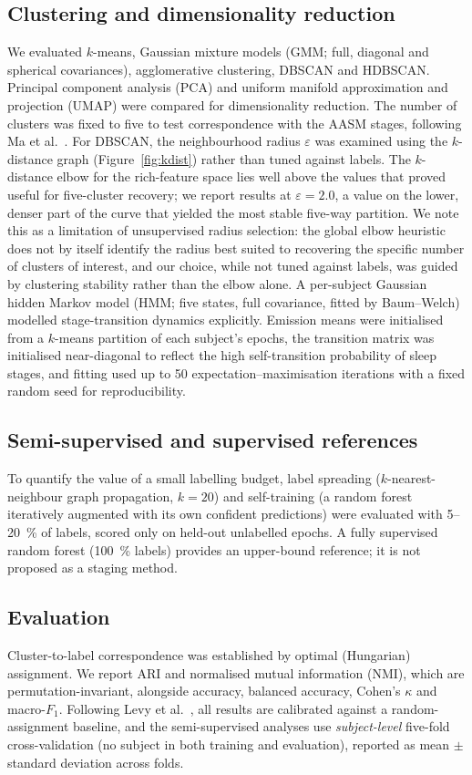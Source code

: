 \documentclass[11pt,a4paper]{article}
\begin{document}
\subsection{Clustering and dimensionality reduction}
We evaluated $k$-means, Gaussian mixture models (GMM; full, diagonal and spherical
covariances), agglomerative clustering, DBSCAN and HDBSCAN. Principal component
analysis (PCA) and uniform manifold approximation and projection (UMAP) were
compared for dimensionality reduction. The number of clusters was fixed to five to
test correspondence with the AASM stages, following Ma et al.~\cite{ma2026}. For
DBSCAN, the neighbourhood radius $\varepsilon$ was examined using the $k$-distance
graph (Figure~\ref{fig:kdist}) rather than tuned against labels. The $k$-distance
elbow for the rich-feature space lies well above the values that proved useful for
five-cluster recovery; we report results at $\varepsilon=2.0$, a value on the lower,
denser part of the curve that yielded the most stable five-way partition. We note
this as a limitation of unsupervised radius selection: the global elbow heuristic
does not by itself identify the radius best suited to recovering the specific
number of clusters of interest, and our choice, while not tuned against labels, was
guided by clustering stability rather than the elbow alone. A per-subject Gaussian hidden Markov
model (HMM; five states, full covariance, fitted by Baum--Welch) modelled
stage-transition dynamics explicitly. Emission means were initialised from a
$k$-means partition of each subject's epochs, the transition matrix was initialised
near-diagonal to reflect the high self-transition probability of sleep stages, and
fitting used up to 50 expectation--maximisation iterations with a fixed random seed
for reproducibility.

\subsection{Semi-supervised and supervised references}
To quantify the value of a small labelling budget, label spreading
($k$-nearest-neighbour graph propagation, $k=20$) and self-training (a random
forest iteratively augmented with its own confident predictions) were evaluated
with 5--\SI{20}{\percent} of labels, scored only on held-out unlabelled epochs. A
fully supervised random forest (\SI{100}{\percent} labels) provides an upper-bound
reference; it is not proposed as a staging method.

\subsection{Evaluation}
Cluster-to-label correspondence was established by optimal (Hungarian) assignment.
We report ARI and normalised mutual information (NMI), which are
permutation-invariant, alongside accuracy, balanced accuracy, Cohen's $\kappa$ and
macro-$F_1$. Following Levy et al.~\cite{levy2023}, all results are calibrated
against a random-assignment baseline, and the semi-supervised analyses use
\emph{subject-level} five-fold cross-validation (no subject in both training and
evaluation), reported as mean $\pm$ standard deviation across folds.
\end{document}

